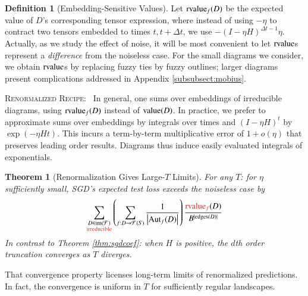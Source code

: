\documentclass{article}
\theoremstyle{plain}
\newtheorem{thm}{Theorem}
\theoremstyle{definition}
\newtheorem{defn}{Definition}
\newcommand{\Free}{\mathcal{F}}
\newcommand{\Aut}{\text{\textnormal{Aut}}}
\newcommand{\image}{\text{\textnormal{im}}}
\newcommand{\dvalue}{\text{\textnormal{value}}}
\newcommand{\rvalue}{\text{\textnormal{rvalue}}}
\newcommand{\edges}{\text{\textnormal{edges}}}
\newcommand{\wrap}[1]{\left(#1\right)}
\newcommand{\wabs}[1]{\left|#1\right|}
\begin{document}
        \begin{defn}[Embedding-Sensitive Values]
            \label{defn:rvalue}
            Let $\rvalue_f(D)$ be the expected value of $D$'s corresponding
            tensor expression, where instead of using $-\eta$ to contract
            two tensors embedded to times $t, t+\Delta t$, we use
            $
                -(I-\eta H)^{\Delta t - 1} \eta
            $.
            Actually, as we study the effect of noise, it will be most
            convenient to let $\rvalue$s represent a \emph{difference} from the
            noiseless case.  For the small diagrams we consider, we obtain
            $\rvalue$s by replacing fuzzy ties by fuzzy outlines; larger
            diagrams present complications addressed in
            Appendix \ref{subsubsect:mobius}.
        \end{defn}

        \textsc{Renormalized Recipe:}~
            In general, one sums over embeddings of irreducible diagrams, using
            $\rvalue_f(D)$ instead of $\dvalue(D)$.  In practice, we prefer to
            approximate sums over embeddings by integrals over times and
            $(I-\eta H)^t$ by $\exp(- \eta H t)$.  This incurs a term-by-term
            multiplicative error of $1 + o(\eta)$ that preserves leading order
            results.  Diagrams thus induce easily evaluated integrals of
            exponentials.
       
        \begin{thm}[Renormalization Gives Large-$T$ Limits] \label{thm:renorm}
            For any $T$: for $\eta$ sufficiently small, SGD's expected test
            loss exceeds the noiseless case by 
            \begin{equation*} \label{eq:renorm}
                \sum_{\substack{D \in \image(\Free)\\ \text{\color{moor} irreducible}}}
                \wrap{
                    \sum_{f: D\to\Free(S)}
                    \frac{1}{\wabs{\Aut_f(D)}}
                }
                \frac{{\color{moor} \rvalue_f}(D)}{B^{|\edges(D)|}}
            \end{equation*}
            In contrast to Theorem \ref{thm:sgdcoef}: when $H$ is positive, the
            $d$th order truncation converges as $T$ diverges.
        \end{thm}
        That convergence property licenses long-term limits of renormalized
        predictions.  In fact, the convergence is uniform in $T$ for
        sufficiently regular landscapes.
\end{document}
